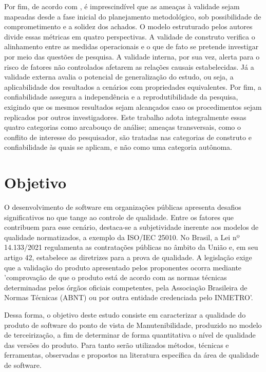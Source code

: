 Por fim, de acordo com , é imprescindível que as ameaças à validade sejam mapeadas desde a fase inicial do planejamento metodológico, sob possibilidade de comprometimento e a solidez dos achados. O modelo estruturado pelos autores divide essas métricas em quatro perspectivas. A validade de construto verifica o alinhamento entre as medidas operacionais e o que de fato se pretende investigar por meio das questões de pesquisa. A validade interna, por sua vez, alerta para o risco de fatores não controlados afetarem as relações causais estabelecidas. Já a validade externa avalia o potencial de generalização do estudo, ou seja, a aplicabilidade dos resultados a cenários com propriedades equivalentes. Por fim, a confiabilidade assegura a independência e a reprodutibilidade da pesquisa, exigindo que os mesmos resultados sejam alcançados caso os procedimentos sejam replicados por outros investigadores. Este trabalho adota integralmente essas quatro categorias como arcabouço de análise; ameaças transversais, como o conflito de interesse do pesquisador, são tratadas nas categorias de construto e confiabilidade às quais se aplicam, e não como uma categoria autônoma.

\section{Objetivo}

O desenvolvimento de software em organizações públicas apresenta desafios significativos no que tange ao controle de qualidade. Entre os fatores que contribuem para esse cenário, destaca-se a subjetividade inerente aos modelos de qualidade normatizados, a exemplo da ISO/IEC 25010. No Brasil, a Lei nº 14.133/2021 \cite{brasil2021lei} regulamenta as contratações públicas no âmbito da União e, em seu artigo 42, estabelece as diretrizes para a prova de qualidade. A legislação exige que a validação do produto apresentado pelos proponentes ocorra mediante 'comprovação de que o produto está de acordo com as normas técnicas determinadas pelos órgãos oficiais competentes, pela Associação Brasileira de Normas Técnicas (ABNT) ou por outra entidade credenciada pelo INMETRO'.

Dessa forma, o objetivo deste estudo consiste em caracterizar a qualidade do produto de software do ponto de vista de Manutenibilidade, produzido no modelo de terceirização, a fim de determinar de forma quantitativa o nível de qualidade das versões do produto. Para tanto serão utilizados métodos, técnicas e ferramentas, observadas e propostos na literatura específica da área de qualidade de software.

